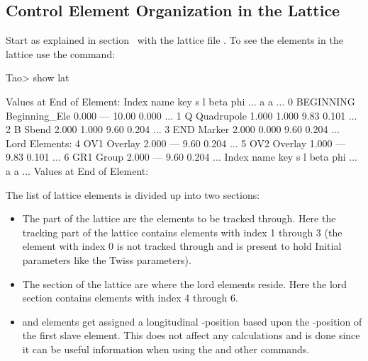 \documentclass{hitec}     %
\begin{document}
\subsection{Control Element Organization in the Lattice}

Start \tao as explained in section~ with the lattice file . To
see the elements in the lattice use the  command:
\begin{code}
Tao> show lat

      Values at End of Element:
 Index  name      key                       s       l    beta     phi ...
                                                            a       a ...
     0  BEGINNING Beginning_Ele         0.000     ---   10.00   0.000 ...
     1  Q         Quadrupole            1.000   1.000    9.83   0.101 ...
     2  B         Sbend                 2.000   1.000    9.60   0.204 ...
     3  END       Marker                2.000   0.000    9.60   0.204 ...
Lord Elements:
     4  OV1       Overlay               2.000     ---    9.60   0.204 ...
     5  OV2       Overlay               1.000     ---    9.83   0.101 ...
     6  GR1       Group                 2.000     ---    9.60   0.204 ...
 Index  name      key                       s       l    beta     phi ...
                                                            a       a ...
      Values at End of Element:
\end{code}

The list of lattice elements is divided up into two sections:
\vspace{-5 pt}
\begin{itemize}
\item
The  part of the lattice are the elements to be tracked through. Here the tracking
part of the lattice contains elements with index 1 through 3 (the  element with index
0 is not tracked through and is present to hold Initial parameters like the Twiss parameters).
%
\item
The  section of the lattice are where the lord elements reside.  Here the lord section contains
elements with index 4 through 6.
%
\item
{} and  elements get assigned a longitudinal -position based upon the
-position of the first slave element. This does not affect any calculations and is done since it
can be useful information when using the  and other  commands.
\end{itemize}
\end{document}
